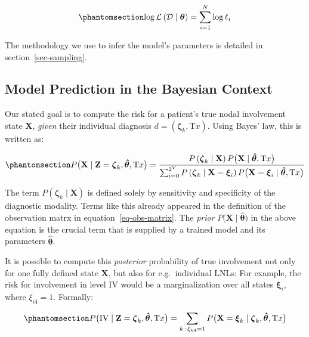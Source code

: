 \documentclass[
  sn-mathphys-num,
]{sn-jnl}
\begin{document}
\begin{equation}\phantomsection\label{eq-log-likelihood}{
\log \mathcal{L} \left( \mathcal{D} \mid \boldsymbol{\theta} \right) = \sum_{i=1}^N \log \ell_i
}\end{equation}

The methodology we use to infer the model's parameters is detailed in
section~\ref{sec-sampling}.

\subsection{Model Prediction in the Bayesian
Context}\label{model-prediction-in-the-bayesian-context}

Our stated goal is to compute the risk for a patient's true nodal
involvement state \(\mathbf{X}\), \emph{given} their individual
diagnosis \(d = \left( \boldsymbol{\zeta}_k, \text{T}x \right)\). Using
Bayes' law, this is written as:

\begin{equation}\phantomsection\label{eq-uni-bayes-law}{
P \big( \mathbf{X} \mid \mathbf{Z}=\boldsymbol{\zeta}_k, \boldsymbol{\hat{\theta}}, \text{T}x \big) = \frac{P \left( \boldsymbol{\zeta}_k \mid \mathbf{X} \right) P \big( \mathbf{X} \mid \boldsymbol{\hat{\theta}}, \text{T}x \big)}{\sum_{i=0}^{2^V} P \left( \boldsymbol{\zeta}_k \mid \mathbf{X}=\boldsymbol{\xi}_i \right) P \big( \mathbf{X}=\boldsymbol{\xi}_i \mid \boldsymbol{\hat{\theta}}, \text{T}x \big)}
}\end{equation}

The term \(P \left( \boldsymbol{\zeta}_k \mid \mathbf{X} \right)\) is
defined solely by sensitivity and specificity of the diagnostic
modality. Terms like this already appeared in the definition of the
observation matrx in equation~\ref{eq-obs-matrix}. The \emph{prior}
\(P \big( \mathbf{X} \mid \boldsymbol{\hat{\theta}} \big)\) in the above
equation is the crucial term that is supplied by a trained model and its
parameters \(\boldsymbol{\hat{\theta}}\).

It is possible to compute this \emph{posterior} probability of true
involvement not only for one fully defined state \(\mathbf{X}\), but
also for e.g.~individual LNLs: For example, the risk for involvement in
level IV would be a marginalization over all states
\(\boldsymbol{\xi}_i\), where \(\xi_{i4}=1\). Formally:

\begin{equation}\phantomsection\label{eq-marg-over-posterior}{
P \big( \text{IV} \mid \mathbf{Z}=\boldsymbol{\zeta}_k, \boldsymbol{\hat{\theta}}, \text{T}x  \big) = \sum_{k \, : \, \xi_{k4}=1} P \big( \mathbf{X} = \boldsymbol{\xi}_k \mid \boldsymbol{\zeta}_k, \boldsymbol{\hat{\theta}}, \text{T}x  \big)
}\end{equation}
\end{document}
